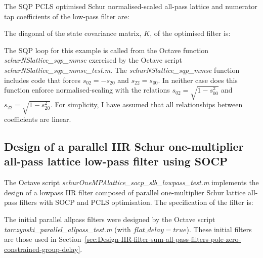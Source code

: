 \documentclass[a4paper,twoside,10pt,english]{report}
\begin{document}
The SQP PCLS optimised Schur normalised-scaled all-pass lattice and numerator 
tap coefficients of the low-pass filter are:
\begin{small}






\end{small}

The diagonal of the state covariance matrix, $K$, of the optimised filter is:
\begin{small}

\end{small}

The SQP loop for this example is called from the Octave
function \emph{schurNSlattice\_sqp\_mmse} exercised by the 
Octave script \emph{schurNSlattice\_sqp\_mmse\_test.m}. 
The \emph{schurNSlattice\_sqp\_mmse} function includes code that forces 
$s_{02}=-s_{20}$ and $s_{22}=s_{00}$. In neither case does this function
enforce normalised-scaling with the relations $s_{02}=\sqrt{1-s_{00}^{2}}$ and
$s_{22}=\sqrt{1-s_{20}^{2}}$. For simplicity, I have assumed that all
relationships between coefficients are linear.

\clearpage
\subsection{\label{sec:Design-parallel-Schur-one-mult-all-pass-lattice-low-pass-SOCP}Design of a parallel IIR Schur one-multiplier all-pass lattice low-pass filter using SOCP}
The Octave script \emph{schurOneMPAlattice\_socp\_slb\_lowpass\_test.m}
implements the design of a lowpass IIR filter composed of parallel
one-multiplier Schur lattice all-pass filters with SOCP and PCLS optimisation.
The specification of the filter is:
\begin{small}

\end{small}
The initial parallel allpass filters were designed by the Octave script 
\emph{tarczynski\_parallel\_allpass\_test.m} (with $flat\_delay=true$).
These initial filters are those used in
Section~\ref{sec:Design-IIR-filter-sum-all-pass-filters-pole-zero-constrained-group-delay}.
\end{document}
